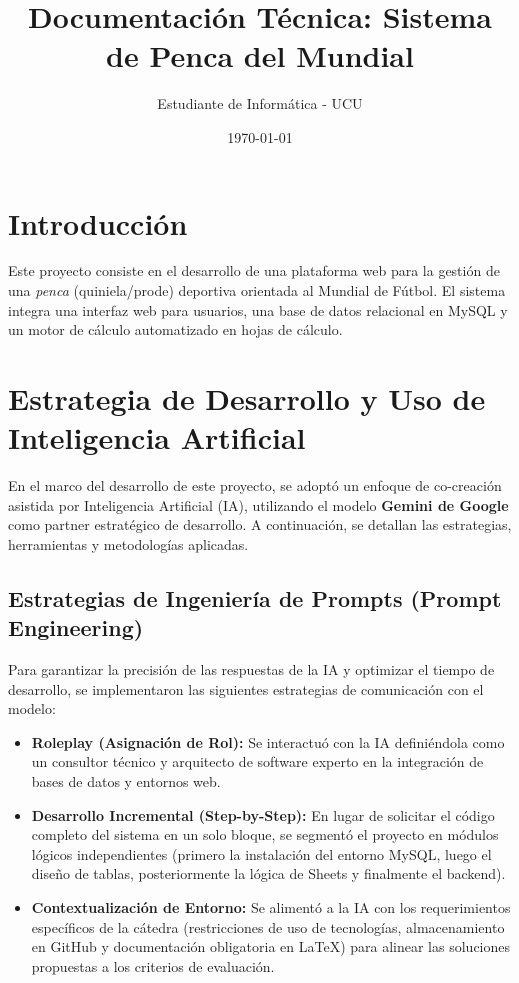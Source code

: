 \documentclass[12pt, a4paper]{article}
\title{Documentación Técnica: Sistema de Penca del Mundial}
\author{Estudiante de Informática - UCU}
\date{\today}
\begin{document}
\maketitle
\newpage

\tableofcontents
\newpage

\sidebar
\section{Introducción}
Este proyecto consiste en el desarrollo de una plataforma web para la gestión de una \textit{penca} (quiniela/prode) deportiva orientada al Mundial de Fútbol. El sistema integra una interfaz web para usuarios, una base de datos relacional en MySQL y un motor de cálculo automatizado en hojas de cálculo.

\section{Estrategia de Desarrollo y Uso de Inteligencia Artificial}

En el marco del desarrollo de este proyecto, se adoptó un enfoque de co-creación asistida por Inteligencia Artificial (IA), utilizando el modelo \textbf{Gemini de Google} como partner estratégico de desarrollo. A continuación, se detallan las estrategias, herramientas y metodologías aplicadas.

\subsection{Estrategias de Ingeniería de Prompts (Prompt Engineering)}
Para garantizar la precisión de las respuestas de la IA y optimizar el tiempo de desarrollo, se implementaron las siguientes estrategias de comunicación con el modelo:
\begin{itemize}
    \item \textbf{Roleplay (Asignación de Rol):} Se interactuó con la IA definiéndola como un consultor técnico y arquitecto de software experto en la integración de bases de datos y entornos web.
    \item \textbf{Desarrollo Incremental (Step-by-Step):} En lugar de solicitar el código completo del sistema en un solo bloque, se segmentó el proyecto en módulos lógicos independientes (primero la instalación del entorno MySQL, luego el diseño de tablas, posteriormente la lógica de Sheets y finalmente el backend).
    \item \textbf{Contextualización de Entorno:} Se alimentó a la IA con los requerimientos específicos de la cátedra (restricciones de uso de tecnologías, almacenamiento en GitHub y documentación obligatoria en \LaTeX) para alinear las soluciones propuestas a los criterios de evaluación.
\end{itemize}
\end{document}
